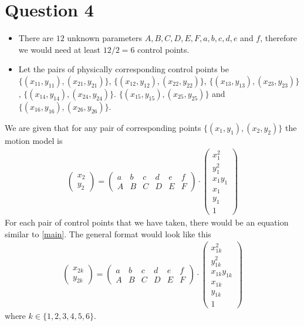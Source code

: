 \documentclass[12pt]{article}
\begin{document}
\section*{Question 4}
    \begin{itemize}
        \item There are $12$ unknown parameters $A,B,C,D,E,F,a,b,c,d,e$ and $f$, therefore we would need at least $12/2 = 6$ 
        control points.
        \item Let the pairs of physically corresponding control points be $\{(x_{11},y_{11}),(x_{21},y_{21})\}$, 
        $\{(x_{12},y_{12}),(x_{22},y_{22})\}$, $\{(x_{13},y_{13}),(x_{23},y_{23})\}$, $\{(x_{14},y_{14}),(x_{24},y_{24})\}$.
        $\{(x_{15},y_{15}),(x_{25},y_{25})\}$ and $\{(x_{16},y_{16}),(x_{26},y_{26})\}$.
    \end{itemize}
    We are given that for any pair of
    corresponding points $\{(x_{1},y_{1}),(x_{2},y_{2})\}$ the motion model is
    \begin{align}
        \label{main}
        \begin{pmatrix}
            x_{2} \\
            y_{2}
        \end{pmatrix}
        =
        \begin{pmatrix}
            a & b & c & d & e & f \\
            A & B & C & D & E & F
        \end{pmatrix}
        \cdot
        \begin{pmatrix}
            x_{1}^{2} \\
            y_{1}^{2} \\
            x_{1}y_{1} \\
            x_{1} \\
            y_{1} \\
            1
        \end{pmatrix}
    \end{align}
    For each pair of control points that we have taken, there would be an equation similar to \ref{main}. The general format
    would look like this 
    \begin{align}
        \label{spec}
        \begin{pmatrix}
            x_{2k} \\
            y_{2k}
        \end{pmatrix}
        =
        \begin{pmatrix}
            a & b & c & d & e & f \\
            A & B & C & D & E & F
        \end{pmatrix}
        \cdot
        \begin{pmatrix}
            x_{1k}^{2} \\
            y_{1k}^{2} \\
            x_{1k}y_{1k} \\
            x_{1k} \\
            y_{1k} \\
            1
        \end{pmatrix}        
    \end{align}
    where $k \in \{1,2,3,4,5,6\}$. 
\end{document}
